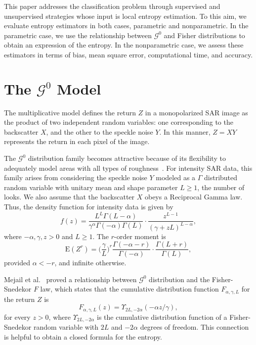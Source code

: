 \documentclass[journal]{IEEEtran}
\begin{document}
This paper addresses the classification problem through supervised and unsupervised strategies whose input is local entropy estimation. 
To this aim, we evaluate entropy estimators in both cases, parametric and nonparametric. 
In the parametric case, we use the relationship between $\mathcal{G}^0$ and Fisher distributions to obtain an expression of the entropy. 
In the nonparametric case, we assess these estimators in terms of bias, mean square error, computational time, and accuracy. 

\section{The $\mathcal{G}^0$ Model}
\label{sec_SAR}

The multiplicative model defines the return $Z$ in a monopolarized SAR image as the product of two independent random variables: one corresponding to the backscatter $X$, and the other to the speckle noise $Y$.
In this manner, $Z=X Y$ represents the return in each pixel of the image.

The $\mathcal{G}^{0}$ distribution family becomes attractive because of its flexibility to adequately model areas with all types of roughness~\cite{MejailJacoboFreryBustos:IJRS,  mejailfreryjacobobustos2001}. 
For intensity SAR data, this family arises from considering the speckle noise $Y$ modeled as a $\Gamma$ distributed random variable with unitary mean and shape parameter $L\geq1$, the number of looks. We also assume that the backscatter $X$ obeys a Reciprocal Gamma law.  
Thus, the density function for intensity data is given by
\begin{equation}
	f(z) =\frac{L^{L}\Gamma ( L-\alpha
		) }{\gamma ^{\alpha }\Gamma ( -\alpha ) \Gamma (
		L) }\cdot  
	\frac{z^{L-1}}{( \gamma +zL) ^{L-\alpha }},%
	\label{}
\end{equation}
where $-\alpha,\gamma ,z>0$ and $L\geq 1$. 
The $r$-order moment is
\begin{equation}
	\text{E}(Z^r) =\Big(\frac{\gamma}{L}\Big)^r\frac{\Gamma ( -\alpha-r )}{ \Gamma (-\alpha) } \cdot
	\frac{\Gamma (L+r )}{\Gamma (L)},
	\label{moments_gI0}
\end{equation}
provided $\alpha<-r$, and infinite otherwise.

Mejail et al.~\cite{MejailJacoboFreryBustos:IJRS} proved a relationship between $\mathcal G^0$ distribution and the Fisher-Snedekor $F$ law, which states that the cumulative distribution function $F_{\alpha,\gamma,L}$ for the return $Z$ is
\begin{equation}
	F_{\alpha,\gamma,L}(z) = \Upsilon_{2L, -2\alpha}(-\alpha  z / \gamma),
	\label{eq:CDFG0}
\end{equation}
for every $z>0$, where $\Upsilon_{2L, -2\alpha}$ is the cumulative distribution function of a Fisher-Snedekor random variable with $2L$ and $-2\alpha$ degrees of freedom.
This connection is helpful to obtain a closed formula for the entropy. 
\end{document}
